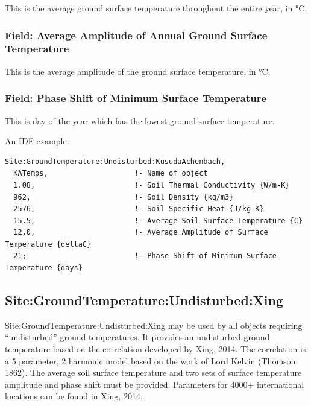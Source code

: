 This is the average ground surface temperature throughout the entire year, in \si{\degreeCelsius}.

\subsubsection{Field: Average Amplitude of Annual Ground Surface Temperature}\label{field-average-amplitude-of-annual-ground-surface-temperature}

This is the average amplitude of the ground surface temperature, in \si{\degreeCelsius}.

\subsubsection{Field: Phase Shift of Minimum Surface Temperature}\label{field-phase-shift-of-minimum-surface-temperature}

This is day of the year which has the lowest ground surface temperature.

An IDF example:

\begin{lstlisting}
Site:GroundTemperature:Undisturbed:KusudaAchenbach,
  KATemps,                    !- Name of object
  1.08,                       !- Soil Thermal Conductivity {W/m-K}
  962,                        !- Soil Density {kg/m3}
  2576,                       !- Soil Specific Heat {J/kg-K}
  15.5,                       !- Average Soil Surface Temperature {C}
  12.0,                       !- Average Amplitude of Surface Temperature {deltaC}
  21;                         !- Phase Shift of Minimum Surface Temperature {days}
\end{lstlisting}

\subsection{Site:GroundTemperature:Undisturbed:Xing}\label{sitegroundtemperatureundisturbedxing}

Site:GroundTemperature:Undisturbed:Xing may be used by all objects requiring ``undisturbed'' ground temperatures. It provides an undisturbed ground temperature based on the correlation developed by Xing, 2014. The correlation is a 5 parameter, 2 harmonic model based on the work of Lord Kelvin (Thomson, 1862). The average soil surface temperature and two sets of surface temperature amplitude and phase shift must be provided. Parameters for 4000+ international locations can be found in Xing, 2014.

